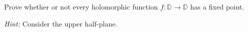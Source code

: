 Prove whether or not every holomorphic function $f : \mathbb{D} \to \mathbb{D}$ has a fixed point.

\textit{Hint:} Consider the upper half-plane.

\begin{solution}
  \ \\
\end{solution}